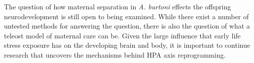 \documentclass[12pt,twoside]{reedthesis}
\begin{document}
The question of how maternal separation in \textit{A.
  burtoni} effects the offspring neurodevelopment is still open to being
examined.  While there exist a number of untested methods for answering the
question, there is also the question of what a teleost model of maternal care
can be.  Given the large influence that early life stress exposure has on the developing
brain and body, it is important to continue research that uncovers the
mechanisms behind HPA axis reprogramming.





 
\end{document}
